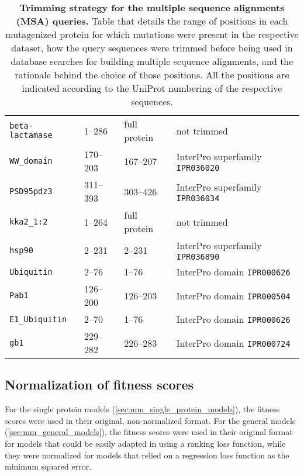\begin{table}[p]
{\begin{tabular*}{\linewidth}{@{\extracolsep{\fill}}llll}
			\texttt{beta-lactamase} & \numrange{1}{286}   & full protein        & not trimmed                             \\
			\texttt{WW\_domain}     & \numrange{170}{203} & \numrange{167}{207} & InterPro superfamily \texttt{IPR036020} \\
			\texttt{PSD95pdz3}      & \numrange{311}{393} & \numrange{303}{426} & InterPro superfamily \texttt{IPR036034} \\
			\texttt{kka2\_1:2}      & \numrange{1}{264}   & full protein        & not trimmed                             \\
			\texttt{hsp90}          & \numrange{2}{231}   & \numrange{2}{231}   & InterPro superfamily \texttt{IPR036890} \\
			\texttt{Ubiquitin}      & \numrange{2}{76}    & \numrange{1}{76}    & InterPro domain \texttt{IPR000626}      \\
			\texttt{Pab1}           & \numrange{126}{200} & \numrange{126}{203} & InterPro domain \texttt{IPR000504}      \\
			\texttt{E1\_Ubiquitin}  & \numrange{2}{70}    & \numrange{1}{76}    & InterPro domain \texttt{IPR000626}      \\
			\texttt{gb1}            & \numrange{229}{282} & \numrange{226}{283} & InterPro domain \texttt{IPR000724}      \\
			\bottomrule
		\end{tabular*}%
	}%
	{\caption[Trimming strategy for the multiple sequence alignments queries]{%
			\textbf{Trimming strategy for the multiple sequence alignments (MSA) queries.} Table that details the range of positions in each mutagenized protein for which mutations were present in the respective dataset, how the query sequences were trimmed before being used in database searches for building multiple sequence alignments, and the rationale behind the choice of those positions.
			All the positions are indicated according to the UniProt numbering of the respective sequences.
		}\label{tab:mut_range}%
	}%
\end{table}

\subsection{Normalization of fitness scores}\label{sec:mm_quantile_norm}
For the single protein models (\autoref{sec:mm_single_protein_models}), the fitness scores were used in their original, non-normalized format.
For the general models (\autoref{sec:mm_general_models}), the fitness scores were used in their original format for models that could be easily adapted in using a ranking loss function, while they were normalized for models that relied on a regression loss function as the minimum squared error.

